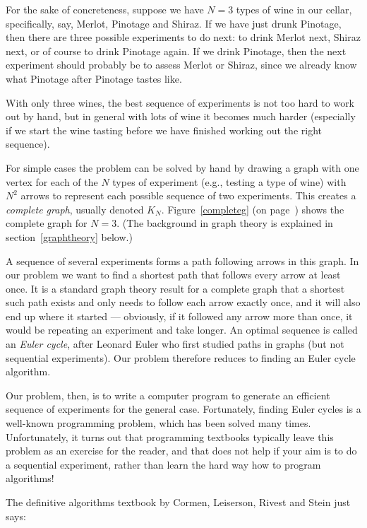 \documentclass[preprint,times]{elsarticle}
\begin{document}
For the sake of concreteness, suppose we have $N=3$ types of wine in our cellar, specifically, say, Merlot, Pinotage and Shiraz. If we have just drunk Pinotage, then there are three possible experiments to do next: to drink Merlot next, Shiraz next, or of course to drink Pinotage again. If we drink Pinotage, then the next experiment should probably be to assess Merlot or Shiraz, since we already know what Pinotage after Pinotage tastes like. 

With only three wines, the best sequence of experiments is not too hard to work out by hand, but in general with lots of wine it becomes much harder (especially if we start the wine tasting before we have finished working out the right sequence).

For simple cases the problem can be solved by hand by drawing a graph with one vertex for each of the $N$ types of experiment (e.g., testing a type of wine) with $N^2$  arrows to represent each possible sequence of two experiments. This creates a \emph{complete graph}, usually denoted $K_N$\@. Figure~\ref{completeg} (on page~\pageref{completeg}) shows the complete graph for $N=3$. (The background in graph theory is explained in section~\ref{graphtheory} below.)

A sequence of several experiments forms a path following arrows in this graph. In our problem we want to find a shortest path that follows every arrow at least once. It is a standard graph theory result for a complete graph that a shortest such path exists and only needs to follow each arrow exactly once, and it will also end up where it started --- obviously, if it followed any arrow more than once, it would be repeating an experiment and take longer. An optimal sequence is called an \emph{Euler cycle}, after Leonard Euler who first studied paths in graphs (but not sequential experiments). Our problem therefore reduces to finding an Euler cycle algorithm. 

Our problem, then, is to write a computer program to generate an efficient sequence of experiments for the general case. Fortunately, finding Euler cycles is a well-known programming problem, which has been solved many times. Unfortunately, it turns out that programming textbooks typically leave this problem as an exercise for the reader, and that does not help if your aim is to do a sequential experiment, rather than learn the hard way how to program algorithms! 

The definitive algorithms textbook by Cormen, Leiserson, Rivest and Stein just says: %
\end{document}
